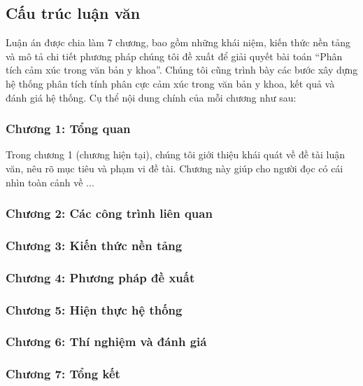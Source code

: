 \subsection{Cấu trúc luận văn}
Luận án được chia làm 7 chương, bao gồm những khái niệm, kiến thức nền tảng và mô tả chi tiết phương pháp chúng tôi đề xuất để giải quyết bài toán ``Phân tích cảm xúc trong văn bản y khoa''. Chúng tôi cũng trình bày các bước xây dựng hệ thống phân tích tính phân cực cảm xúc trong văn bản y khoa, kết quả và đánh giá hệ thống. Cụ thể nội dung chính của mỗi chương như sau:

\subsubsection*{Chương 1: Tổng quan}
Trong chương 1 (chương hiện tại), chúng tôi giới thiệu khái quát về đề tài luận văn, nêu rõ mục tiêu và phạm vi đề tài. Chương này giúp cho người đọc có cái nhìn toàn cảnh về ...
\subsubsection*{Chương 2: Các công trình liên quan}
\subsubsection*{Chương 3: Kiến thức nền tảng}
\subsubsection*{Chương 4: Phương pháp đề xuất}
\subsubsection*{Chương 5: Hiện thực hệ thống}
\subsubsection*{Chương 6: Thí nghiệm và đánh giá}
\subsubsection*{Chương 7: Tổng kết}
